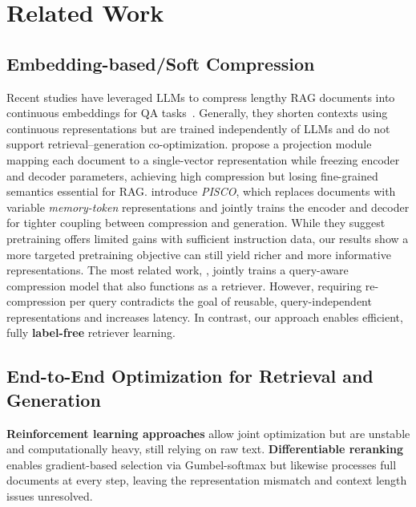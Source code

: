 \documentclass{applemlr}
\numberwithin{equation}{section}
\begin{document}
\section{Related Work}






\subsection{Embedding-based/Soft Compression}
Recent studies have leveraged LLMs to compress lengthy RAG documents into continuous embeddings for QA tasks~\citep{chevalier-etal-2023-adapting,ge2024incontext,10.5555/3666122.3666970,xiao2025metaembedscalingmultimodalretrieval,dai-etal-2025-pretraining,kuratov-etal-2025-cramming}. Generally, they shorten contexts using continuous representations but are trained independently of LLMs and do not support retrieval–generation co-optimization.
\citet{10.5555/3737916.3741392} propose a projection module mapping each document to a single-vector representation while freezing encoder and decoder parameters, achieving high compression but losing fine-grained semantics essential for RAG. 
\citet{louis-etal-2025-pisco} introduce \textit{PISCO}, which replaces documents with variable \textit{memory-token} representations and jointly trains the encoder and decoder for tighter coupling between compression and generation.
While they suggest pretraining offers limited gains with sufficient instruction data, our results show a more targeted pretraining objective can still yield richer and more informative representations.
The most related work, \citet{louis2025oscaronlinesoftcompression}, jointly trains a query-aware compression model that also functions as a retriever. However, requiring re-compression per query contradicts the goal of reusable, query-independent representations and increases latency. In contrast, our approach enables efficient, fully \textbf{label-free} retriever learning.

\subsection{End-to-End Optimization for Retrieval and Generation}
\textbf{Reinforcement learning approaches} \citep{shi2025directretrievalaugmentedoptimizationsynergizing} allow joint optimization but are unstable and computationally heavy, still relying on raw text.
\textbf{Differentiable reranking} \citep{huang-etal-2025-gumbel} enables gradient-based selection via Gumbel-softmax but likewise processes full documents at every step, leaving the representation mismatch and context length issues unresolved.
\end{document}

